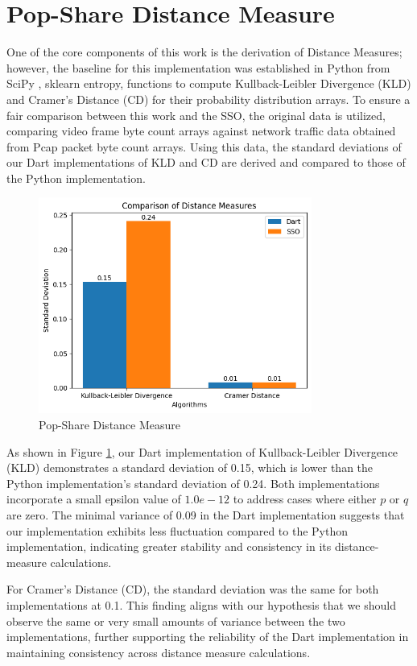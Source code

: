 \section{Pop-Share Distance Measure}
\label{sec:Pop-Share Distance Measure}
One of the core components of this work is the derivation of Distance Measures; however, the baseline for this implementation was established in Python from SciPy \cite{2020SciPy-NMeth}, sklearn entropy, functions to compute Kullback-Leibler Divergence (KLD) and Cramer’s Distance (CD) for their probability distribution arrays. To ensure a fair comparison between this work and the SSO, the original data is utilized, comparing video frame byte count arrays against network traffic data obtained from Pcap packet byte count arrays. Using this data, the standard deviations of our Dart implementations of KLD and CD are derived and compared to those of the Python implementation.

\begin{figure}[t]
    \centering
    \includegraphics[width=0.8\textwidth]{5 Results/Figures/5.2 Bar Chart.png}
    \caption{Pop-Share Distance Measure}
    \label{fig:pop-share-distance-measure}
\end{figure}

As shown in Figure \ref{fig:pop-share-distance-measure}, our Dart implementation of Kullback-Leibler Divergence (KLD) demonstrates a standard deviation of 0.15, which is lower than the Python implementation’s standard deviation of 0.24. Both implementations incorporate a small epsilon value of $1.0e-12$ to address cases where either $p$ or $q$ are zero. The minimal variance of 0.09 in the Dart implementation suggests that our implementation exhibits less fluctuation compared to the Python implementation, indicating greater stability and consistency in its distance-measure calculations.

For Cramer's Distance (CD), the standard deviation was the same for both implementations at 0.1. This finding aligns with our hypothesis that we should observe the same or very small amounts of variance between the two implementations, further supporting the reliability of the Dart implementation in maintaining consistency across distance measure calculations.
